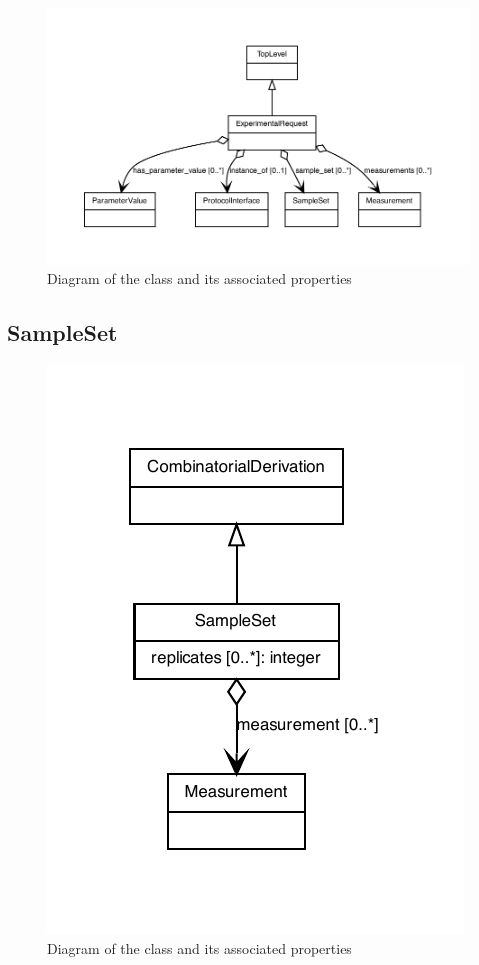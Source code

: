 \begin{figure}[ht]
\begin{center}
\includegraphics[scale=0.8]{figures/ExperimentalRequest}
\caption[]{Diagram of the  class and its associated properties}
\label{uml:ExperimentRequest}
\end{center}
\end{figure}


\subsection{SampleSet}
\label{sec:SampleSet}

\begin{figure}[ht]
\begin{center}
\includegraphics[scale=0.8]{figures/SampleSet}
\caption[]{Diagram of the  class and its associated properties}
\label{uml:SampleSet}
\end{center}
\end{figure}


